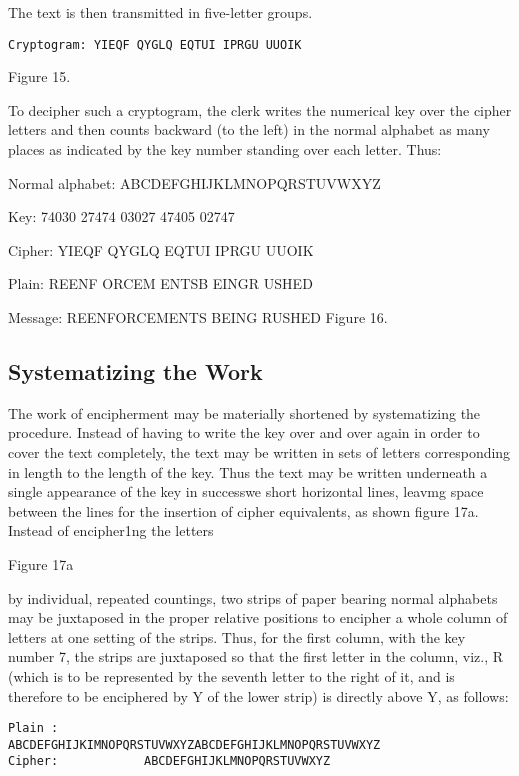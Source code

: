 The text is then transmitted in ﬁve-letter groups.
\begin{verbatim}
Cryptogram: YIEQF QYGLQ EQTUI IPRGU UUOIK
\end{verbatim}

Figure 15.

\mypara To decipher such a cryptogram, the clerk writes the numerical key
over the cipher letters and then counts backward (to the left) in the
normal alphabet as many places as indicated by the key number standing
over each letter. Thus:

Normal alphabet: ABCDEFGHIJKLMNOPQRSTUVWXYZ

Key: 74030 27474 03027 47405 02747

Cipher: YIEQF QYGLQ EQTUI IPRGU UUOIK

Plain: REENF ORCEM ENTSB EINGR USHED

Message: REENFORCEMENTS BEING RUSHED
Figure 16.

\subsection{Systematizing the Work}

The work of encipherment may be materially shortened by systematizing the procedure. Instead of having to write the key over and over again
in order to cover the text completely, the text may be written in sets of
letters corresponding in length to the length of
the key. Thus the text may be written underneath
a single appearance of the key in successwe short
horizontal lines, leavmg space between the lines
for the insertion of cipher equivalents, as shown
ﬁgure 17a. Instead of encipher1ng the letters

Figure 17a 

by individual, repeated countings, two strips of paper bearing normal
alphabets may be juxtaposed in the proper relative positions to encipher
a whole column of letters at one setting of the strips. Thus, for the ﬁrst
column, with the key number 7, the strips are juxtaposed so that the ﬁrst
letter in the column, viz., R (which is to be represented by the seventh
letter to the right of it, and is therefore to be enciphered by Y of the
lower strip) is directly above Y, as follows:

\begin{verbatim}
Plain :
ABCDEFGHIJKIMNOPQRSTUVWXYZABCDEFGHIJKLMNOPQRSTUVWXYZ
Cipher:            ABCDEFGHIJKLMNOPQRSTUVWXYZ
\end{verbatim}

